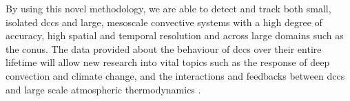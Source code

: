 By using this novel methodology, we are able to detect and track both small, isolated \acrshort{dcc}s and large, mesoscale convective systems with a high degree of accuracy, high spatial and temporal resolution and across large domains such as the \acrshort{conus}.
The data provided about the behaviour of \acrshort{dcc}s over their entire lifetime will allow new research into vital topics such as the response of deep convection and climate change, and the interactions and feedbacks between \acrshort{dcc}s and large scale atmospheric thermodynamics \citep{varble_erroneous_2018}.









